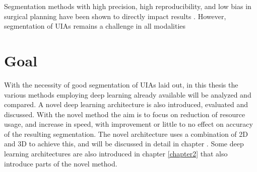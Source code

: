 Segmentation methods with high precision, high reproducibility, and low bias in surgical planning have been shown to directly impact results \cite{Taha2015} . However, segmentation of UIAs remains a challenge in all modalities


\section{Goal}
With the necessity of good segmentation of UIAs laid out, in this thesis the various methods employing deep learning already available will be analyzed and compared. A novel deep learning architecture is also introduced, evaluated and discussed. With the novel method the aim is to focus on reduction of resource usage, and increase in speed, with improvement or little to no effect on accuracy of the resulting segmentation. The novel architecture uses a combination of 2D and 3D to achieve this, and will be discussed in detail in chapter . Some deep learning architectures are also introduced in chapter \ref{chapter2} that also introduce parts of the novel method. 







